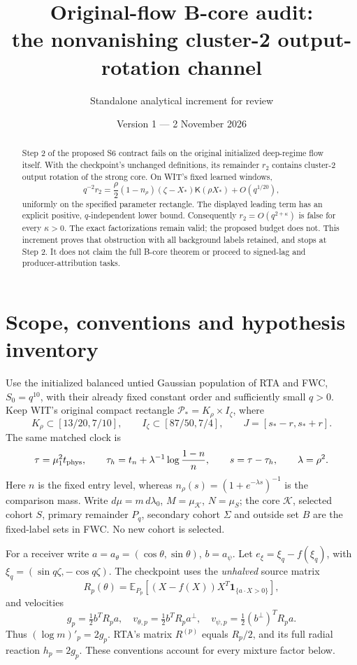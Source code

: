\documentclass[11pt]{article}
\title{Original-flow B-core audit:\\the nonvanishing cluster-2 output-rotation channel}
\author{Standalone analytical increment for review}
\date{Version 1 --- 2 November 2026}
\newcommand{\K}{\mathcal K}
\newcommand{\E}{\mathbb E}
\newcommand{\one}{\mathbf1}
\newcommand{\kf}{\mathsf K}
\begin{document}
\maketitle
\begin{abstract}
Step 2 of the proposed S6 contract fails on the original initialized
deep-regime flow itself. With the checkpoint's unchanged definitions,
its remainder \(r_2\) contains cluster-2 output rotation of the strong
core. On WIT's fixed learned windows,
\[
 q^{-2}r_2=
 \frac{\rho}{2}(1-n_\rho)(\zeta-X_*)\kf(\rho X_*)
 +O(q^{1/20}),
\]
uniformly on the specified parameter rectangle. The displayed leading
term has an explicit positive, \(q\)-independent lower bound.
Consequently \(r_2=O(q^{2+\kappa})\) is false for every \(\kappa>0\).
The exact factorizations remain valid; the proposed budget does not.
This increment proves that obstruction with all background labels
retained, and stops at Step 2. It does not claim the full B-core
theorem or proceed to signed-lag and producer-attribution tasks.
\end{abstract}

\section{Scope, conventions and hypothesis inventory}
\label{an01bcv1:inventory}
Use the initialized balanced untied Gaussian population of RTA and FWC,
\(S_0=q^{10}\), with their already fixed constant order and sufficiently
small \(q>0\). Keep WIT's original compact rectangle
\(\mathcal P_*=K_\rho\times I_\zeta\), where
\[
 K_\rho\subset[13/20,7/10],\qquad
 I_\zeta\subset[87/50,7/4],
 \qquad J=[s_*-r,s_*+r].
\]
The same matched clock is
\[
 \tau=\mu_1^2t_{\rm phys},\qquad
 \tau_h=t_n+\lambda^{-1}\log\frac{1-n}{n},\qquad
 s=\tau-\tau_h,\qquad \lambda=\rho^2.
\]
Here \(n\) is the fixed entry level, whereas
\(n_\rho(s)=(1+e^{-\lambda s})^{-1}\) is the comparison mass.
Write \(d\mu=m\,d\lambda_0\), \(M=\mu_\K\), \(N=\mu_S\);
the core \(\K\), selected cohort \(S\), primary remainder \(P_q\),
secondary cohort \(\Sigma\) and outside set \(B\) are the fixed-label
sets in FWC. No new cohort is selected.

For a receiver write \(a=a_\theta=(\cos\theta,\sin\theta)\),
\(b=a_\psi\). Let \(e_\xi=\xi_q-f(\xi_q)\), with
\(\xi_q=(\sin q\zeta,-\cos q\zeta)\).
The checkpoint uses the \emph{unhalved} source matrix
\[
 R_p(\theta)=\E_{P_p}[(X-f(X))X^T\one_{\{a\cdot X>0\}}],
\]
and velocities
\[
 g_p=\tfrac12 b^TR_pa,\quad
 v_{\theta,p}=\tfrac12 b^TR_pa^\perp,\quad
 v_{\psi,p}=\tfrac12(b^\perp)^TR_pa.
\]
Thus \((\log m)'_p=2g_p\). RTA's matrix \(R^{(p)}\) equals
\(R_p/2\), and its full radial reaction \(h_p=2g_p\).
These conventions account for every mixture factor below.
\end{document}
